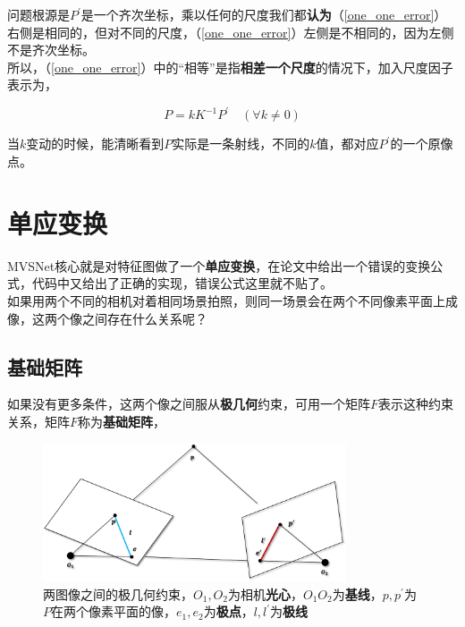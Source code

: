 \documentclass[hpyerref,UTF8,a4paper,titlepage,12pt,oneside]{ctexbook}
\theoremstyle{definition}
\begin{document}
	问题根源是$P^{\prime}$是一个齐次坐标，乘以任何的尺度我们都\textbf{认为}（\ref{one_one_error}）右侧是相同的，但对不同的尺度，（\ref{one_one_error}）左侧是不相同的，因为左侧不是齐次坐标。\\

	所以，（\ref{one_one_error}）中的“相等”是指\textbf{相差一个尺度}的情况下，加入尺度因子表示为，

	\begin{equation}
		P = kK^{-1}P^{\prime} \quad(\forall k \neq 0) \label{inverse_proj}
	\end{equation}

	当$k$变动的时候，能清晰看到$P$实际是一条射线，不同的$k$值，都对应$P^{\prime}$的一个原像点。

\section{单应变换}
	MVSNet核心就是对特征图做了一个\textbf{单应变换}，在论文中给出一个错误的变换公式，代码中又给出了正确的实现，错误公式这里就不贴了。\\

	如果用两个不同的相机对着相同场景拍照，则同一场景会在两个不同像素平面上成像，这两个像之间存在什么关系呢？\\

\subsection{基础矩阵}

	如果没有更多条件，这两个像之间服从\textbf{极几何}约束，可用一个矩阵$F$表示这种约束关系，矩阵$F$称为\textbf{基础矩阵}，

	\begin{figure}[H]
		\begin{center}
			\includegraphics[width=0.8\textwidth]{images/base_matrix.png}
		\end{center}
		\caption{两图像之间的极几何约束，$O_1,O_2$为相机\textbf{光心}，$O_1O_2$为\textbf{基线}，$p,p^{\prime}$为$P$在两个像素平面的像，$e_1,e_2$为\textbf{极点}，$l,l^{\prime}$为\textbf{极线}}
	\end{figure}
\end{document}

